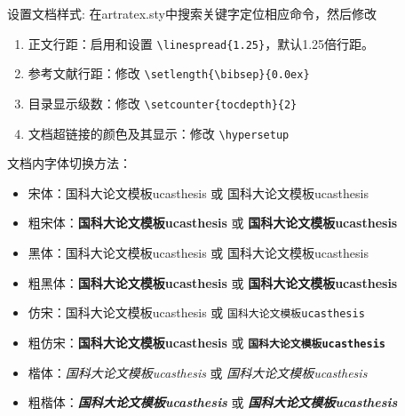 {设置文档样式: 在artratex.sty中搜索关键字定位相应命令，然后修改
\begin{enumerate}
    \item 正文行距：启用和设置 \verb|\linespread{1.25}|，默认1.25倍行距。
    \item 参考文献行距：修改 \verb|\setlength{\bibsep}{0.0ex}|
    \item 目录显示级数：修改 \verb|\setcounter{tocdepth}{2}|
    \item 文档超链接的颜色及其显示：修改 \verb|\hypersetup|
\end{enumerate}

文档内字体切换方法：
    \begin{itemize}
        \item 宋体：国科大论文模板ucasthesis 或 \textrm{国科大论文模板ucasthesis}
        \item 粗宋体：{\bfseries 国科大论文模板ucasthesis} 或 \textbf{国科大论文模板ucasthesis}
        \item 黑体：{\sffamily 国科大论文模板ucasthesis} 或 \textsf{国科大论文模板ucasthesis}
        \item 粗黑体：{\bfseries\sffamily 国科大论文模板ucasthesis} 或 \textsf{\bfseries 国科大论文模板ucasthesis}
        \item 仿宋：{\ttfamily 国科大论文模板ucasthesis} 或 \texttt{国科大论文模板ucasthesis}
        \item 粗仿宋：{\bfseries\ttfamily 国科大论文模板ucasthesis} 或 \texttt{\bfseries 国科大论文模板ucasthesis}
        \item 楷体：{\itshape 国科大论文模板ucasthesis} 或 \textit{国科大论文模板ucasthesis}
        \item 粗楷体：{\bfseries\itshape 国科大论文模板ucasthesis} 或 \textit{\bfseries 国科大论文模板ucasthesis}
    \end{itemize}

\let\cleardoublepage\relax
}
